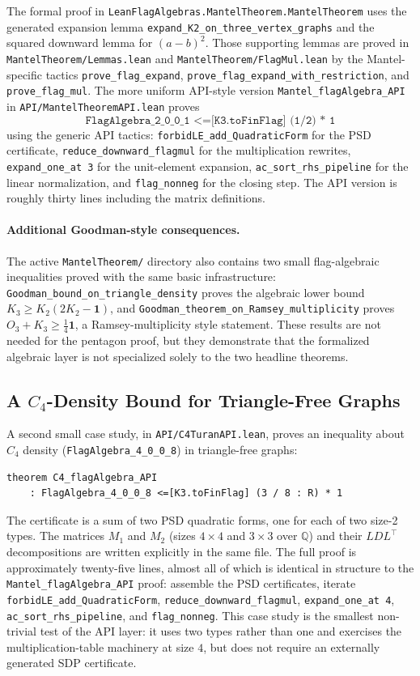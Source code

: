 \documentclass{article}
\newcommand{\Q}{\mathbb{Q}}
\newcommand{\lean}[1]{\texttt{#1}}
\begin{document}
The formal proof in \lean{LeanFlagAlgebras.MantelTheorem.MantelTheorem} uses
the generated expansion lemma \lean{expand\_K2\_on\_three\_vertex\_graphs}
and the squared downward lemma for $(a-b)^2$.  Those supporting lemmas are
proved in \lean{MantelTheorem/Lemmas.lean} and
\lean{MantelTheorem/FlagMul.lean} by the Mantel-specific tactics
\lean{prove\_flag\_expand}, \lean{prove\_flag\_expand\_with\_restriction},
and \lean{prove\_flag\_mul}.  The more uniform API-style version
\lean{Mantel\_flagAlgebra\_API} in \lean{API/MantelTheoremAPI.lean} proves
\[
  \lean{FlagAlgebra\_2\_0\_0\_1 <=[K3.toFinFlag] (1/2) * 1}
\]
using the generic API tactics: \lean{forbidLE\_add\_QuadraticForm} for the
PSD certificate, \lean{reduce\_downward\_flagmul} for the multiplication
rewrites, \lean{expand\_one\_at 3} for the unit-element expansion,
\lean{ac\_sort\_rhs\_pipeline} for the linear normalization, and
\lean{flag\_nonneg} for the closing step.  The API version is roughly thirty
lines including the matrix definitions.

\paragraph{Additional Goodman-style consequences.}
The active \lean{MantelTheorem/} directory also contains two small
flag-algebraic inequalities proved with the same basic infrastructure:
\lean{Goodman\_bound\_on\_triangle\_density} proves the algebraic lower bound
$K_3 \geq K_2(2K_2-\mathbf{1})$, and
\lean{Goodman\_theorem\_on\_Ramsey\_multiplicity} proves
$O_3 + K_3 \geq \frac14\mathbf{1}$, a Ramsey-multiplicity style statement.
These results are not needed for the pentagon proof, but they demonstrate
that the formalized algebraic layer is not specialized solely to the two
headline theorems.

\subsection{A $C_4$-Density Bound for Triangle-Free Graphs}

A second small case study, in \lean{API/C4TuranAPI.lean}, proves an
inequality about $C_4$ density (\lean{FlagAlgebra\_4\_0\_0\_8}) in
triangle-free graphs:
\begin{lstlisting}
theorem C4_flagAlgebra_API
    : FlagAlgebra_4_0_0_8 <=[K3.toFinFlag] (3 / 8 : R) * 1
\end{lstlisting}
The certificate is a sum of two PSD quadratic forms, one for each of two
size-2 types.  The matrices $M_1$ and $M_2$ (sizes $4 \times 4$ and
$3 \times 3$ over $\Q$) and their $LDL^\top$ decompositions are written
explicitly in the same file.  The full proof is approximately twenty-five
lines, almost all of which is identical in structure to the
\lean{Mantel\_flagAlgebra\_API} proof: assemble the PSD certificates,
iterate \lean{forbidLE\_add\_QuadraticForm}, \lean{reduce\_downward\_flagmul},
\lean{expand\_one\_at 4}, \lean{ac\_sort\_rhs\_pipeline}, and
\lean{flag\_nonneg}.  This case study is the smallest non-trivial test of
the API layer: it uses two types rather than one and exercises the
multiplication-table machinery at size $4$, but does not require an
externally generated SDP certificate.
\end{document}
